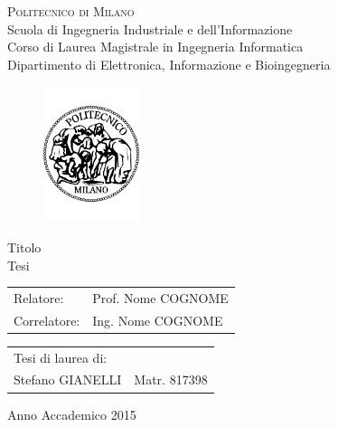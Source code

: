 \begin{titlepage}

\begin{center}
\Large{\textsc{Politecnico di Milano}}\\
\Large{Scuola di Ingegneria Industriale e dell'Informazione}\\
\large{Corso di Laurea Magistrale in Ingegneria Informatica}\\
\large{Dipartimento di Elettronica, Informazione e Bioingegneria}
\par\end{center}

\vspace{0.5cm}


\begin{center}
\begin{figure}[h]
\centering{}\includegraphics[width=0.25\textwidth]{frontespizio/logo-polimi.pdf}
\end{figure}
\vspace{1cm}

\par\end{center}

\begin{center}
\LARGE{Titolo\\
Tesi}\vspace{2cm}

\par\end{center}

\begin{flushleft}
\begin{tabular}{ll}
Relatore:  & Prof. Nome COGNOME\tabularnewline
Correlatore:  & Ing. Nome COGNOME\tabularnewline
\end{tabular}\vspace{1cm}

\par\end{flushleft}

\begin{flushright}
\begin{tabular}{ll}
Tesi di laurea di: & \tabularnewline
Stefano GIANELLI & Matr. 817398\tabularnewline
\end{tabular}\vspace{4cm}

\par\end{flushright}

\begin{center}
{\large{}Anno Accademico 2015}
\par\end{center}{\large \par}

\end{titlepage}

